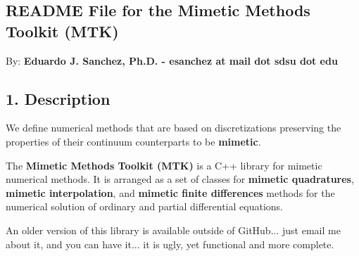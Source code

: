 
\begin{DoxyPre}
\section*{README File for the Mimetic Methods Toolkit (MTK)}\end{DoxyPre}



\begin{DoxyPre}\end{DoxyPre}



\begin{DoxyPre}By: {\bfseries Eduardo J. Sanchez, Ph.D. - esanchez at mail dot sdsu dot edu}


\end{DoxyPre}



\begin{DoxyPre}\subsection*{1. Description}\end{DoxyPre}



\begin{DoxyPre}\end{DoxyPre}



\begin{DoxyPre}We define numerical methods that are based on discretizations preserving the
properties of their continuum counterparts to be {\bfseries mimetic}.\end{DoxyPre}



\begin{DoxyPre}The {\bfseries Mimetic Methods Toolkit (MTK)} is a C++ library for mimetic numerical
methods. It is arranged as a set of classes for {\bfseries mimetic quadratures},
{\bfseries mimetic interpolation}, and {\bfseries mimetic finite differences} methods for the
numerical solution of ordinary and partial differential equations.\end{DoxyPre}



\begin{DoxyPre}An older version of this library is available outside of GitHub... just email me
about it, and you can have it... it is ugly, yet functional and more complete.


\end{DoxyPre}



